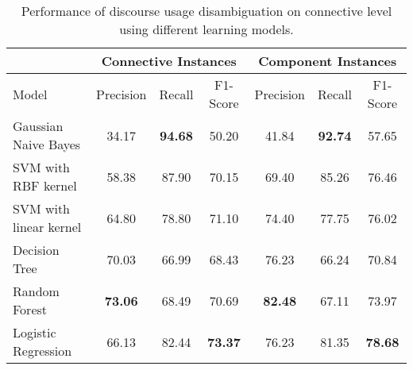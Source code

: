 \begin{table}[ht]
\centering
\begin{tabular}{|l|c|c|c|c|c|c|}
\hline
                            & \multicolumn{3}{c|}{Connective Instances} & \multicolumn{3}{c|}{Component Instances}  \\ \hline
    Model                   &     Precision &     Recall &     F1-Score  &     Precision &     Recall &     F1-Score \\ \hline
    Gaussian Naive Bayes    &     34.17     & \bf 94.68  &     50.20     &     41.84     & \bf 92.74  &     57.65    \\ \hline
    SVM with RBF kernel     &     58.38     &     87.90  &     70.15     &     69.40     &     85.26  &     76.46    \\ \hline
    SVM with linear kernel  &     64.80     &     78.80  &     71.10     &     74.40     &     77.75  &     76.02    \\ \hline
    Decision Tree           &     70.03     &     66.99  &     68.43     &     76.23     &     66.24  &     70.84    \\ \hline
    Random Forest           & \bf 73.06     &     68.49  &     70.69     & \bf 82.48     &     67.11  &     73.97    \\ \hline
    Logistic Regression     &     66.13     &     82.44  & \bf 73.37     &     76.23     &     81.35  & \bf 78.68    \\ \hline

\end{tabular}
\caption{\label{t:recognition-connective-models} Performance of discourse usage
disambiguation on connective level using different learning models. }
\end{table}

